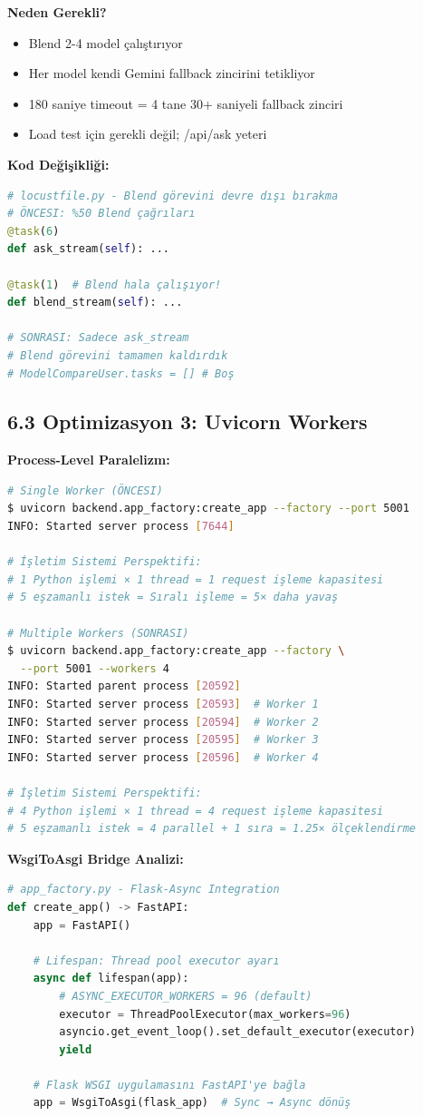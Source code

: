 \documentclass[12pt,a4paper]{report}
\begin{document}
\textbf{Neden Gerekli?}
\begin{itemize}
    \item Blend 2-4 model çalıştırıyor
    \item Her model kendi Gemini fallback zincirini tetikliyor
    \item 180 saniye timeout = 4 tane 30+ saniyeli fallback zinciri
    \item Load test için gerekli değil; /api/ask yeteri
\end{itemize}

\textbf{Kod Değişikliği:}
\begin{lstlisting}[language=Python]
# locustfile.py - Blend görevini devre dışı bırakma
# ÖNCESI: %50 Blend çağrıları
@task(6)
def ask_stream(self): ...

@task(1)  # Blend hala çalışıyor!
def blend_stream(self): ...

# SONRASI: Sadece ask_stream
# Blend görevini tamamen kaldırdık
# ModelCompareUser.tasks = [] # Boş
\end{lstlisting}

\subsection{6.3 Optimizasyon 3: Uvicorn Workers}

\textbf{Process-Level Paralelizm:}

\begin{lstlisting}[language=bash]
# Single Worker (ÖNCESI)
$ uvicorn backend.app_factory:create_app --factory --port 5001
INFO: Started server process [7644]

# İşletim Sistemi Perspektifi:
# 1 Python işlemi × 1 thread = 1 request işleme kapasitesi
# 5 eşzamanlı istek = Sıralı işleme = 5× daha yavaş

# Multiple Workers (SONRASI)
$ uvicorn backend.app_factory:create_app --factory \
  --port 5001 --workers 4
INFO: Started parent process [20592]
INFO: Started server process [20593]  # Worker 1
INFO: Started server process [20594]  # Worker 2
INFO: Started server process [20595]  # Worker 3
INFO: Started server process [20596]  # Worker 4

# İşletim Sistemi Perspektifi:
# 4 Python işlemi × 1 thread = 4 request işleme kapasitesi
# 5 eşzamanlı istek = 4 parallel + 1 sıra = 1.25× ölçeklendirme
\end{lstlisting}

\textbf{WsgiToAsgi Bridge Analizi:}
\begin{lstlisting}[language=Python]
# app_factory.py - Flask-Async Integration
def create_app() -> FastAPI:
    app = FastAPI()
    
    # Lifespan: Thread pool executor ayarı
    async def lifespan(app):
        # ASYNC_EXECUTOR_WORKERS = 96 (default)
        executor = ThreadPoolExecutor(max_workers=96)
        asyncio.get_event_loop().set_default_executor(executor)
        yield
    
    # Flask WSGI uygulamasını FastAPI'ye bağla
    app = WsgiToAsgi(flask_app)  # Sync → Async dönüş
\end{lstlisting}
\end{document}
